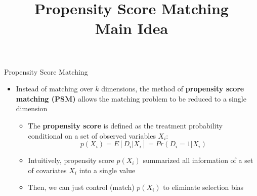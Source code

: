 \documentclass[hyperref={pdfpagelabels=false}]{beamer}
\begin{document}
\title[]  
{Propensity Score Matching \\ Main Idea}


\author 
{}

\institute{}






\date
{}


\begin{frame}{}
\titlepage
\end{frame}





\begin{frame}{Propensity Score Matching}
\begin{itemize}
\item Instead of matching over $k$ dimensions, the method of \textbf{propensity score matching (PSM)} allows the matching
problem to be reduced to a single dimension
\vspace{0.2cm}
\begin{itemize}
\item The \textbf{propensity score} is defined as the treatment probability conditional on a set of observed variables $X_{i}$: 
	\begin{equation*}
	p(X_{i})=E[D_{i}|X_{i}]=Pr(D_{i}=1|X_{i})
	\end{equation*}

\item Intuitively, propensity score $p(X_{i})$ summarized all information of a set of covariates $X_{i}$ into a single value  
\vspace{0.2cm}
\item Then, we can just control (match) $p(X_{i})$ to eliminate selection bias

\end{itemize}
\end{itemize}
\end{frame}
\end{document}
